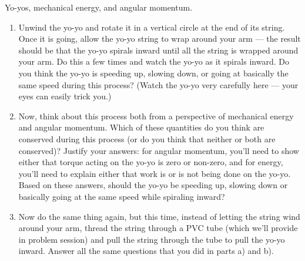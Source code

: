 \begin{aproblem}{Yo-yos, mechanical energy, and angular momentum.}
  \begin{enumerate}
  \item Unwind the yo-yo and rotate it in a vertical circle at the end
    of its string.  Once it is going, allow the yo-yo string to wrap
    around your arm --- the result should be that the yo-yo spirals
    inward until all the string is wrapped around your arm.  Do this a
    few times and watch the yo-yo as it spirals inward.  Do you think
    the yo-yo is speeding up, slowing down, or going at basically the
    same speed during this process?  (Watch the yo-yo very carefully
    here --- your eyes can easily trick you.)

  \item Now, think about this process both from a perspective of
    mechanical energy and angular momentum.  Which of these quantities
    do you think are conserved during this process (or do you think
    that neither or both are conserved)?  Justify your answers: for
    angular momentum, you'll need to show either that torque acting on
    the yo-yo is zero or non-zero, and for energy, you'll need to
    explain either that work is or is not being done on the yo-yo.
    Based on these answers, should the yo-yo be speeding up, slowing
    down or basically going at the same speed while spiraling inward?

  \item Now do the same thing again, but this time, instead of letting
    the string wind around your arm, thread the string through a PVC
    tube (which we'll provide in problem session) and pull the string
    through the tube to pull the yo-yo inward.  Answer all the same
    questions that you did in parts a) and b).
  \end{enumerate}
\end{aproblem}

